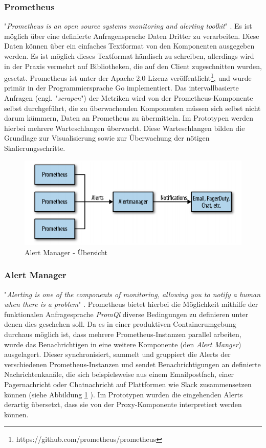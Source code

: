 \subsubsection{Prometheus}
\label{ss:prometheus}
"\emph{Prometheus is an open source systems monitoring and alerting toolkit}" \cite[Seite~400]{oreillyPrometheus}. Es ist möglich über eine definierte Anfragensprache Daten Dritter zu verarbeiten. Diese Daten können über ein einfaches Textformat von den Komponenten ausgegeben werden. Es ist möglich dieses Textformat händisch zu schreiben, allerdings wird in der Praxis vermehrt auf Bibliotheken, die auf den Client zugeschnitten wurden, gesetzt. Prometheus ist unter der Apache 2.0 Lizenz veröffentlicht\footnote{https://github.com/prometheus/prometheus}, und wurde primär in der Programmiersprache Go implementiert. Das intervallbasierte Anfragen (engl. "\emph{scrapen}") der Metriken wird von der Prometheus-Komponente selbst durchgeführt, die zu überwachenden Komponenten müssen sich selbst nicht darum kümmern, Daten an Prometheus zu übermitteln. Im Prototypen werden hierbei mehrere Warteschlangen überwacht. Diese Warteschlangen bilden die Grundlage zur Visualisierung sowie zur Überwachung der nötigen Skalierungsschritte.


\begin{figure}[ht!]
	\centering
	\includegraphics[width=.8\linewidth]{kapitel/problemloesung/implementierung/_img/alert-man-p291}
	\caption[Alert Manager - Übersicht]{Alert Manager - Übersicht \cite[Seite~291]{oreillyPrometheus}}
	\label{fig:alertManOverview}
\end{figure}

\subsubsection{Alert Manager}
"\emph{Alerting is one of the components of monitoring, allowing you to notify a human when there is a problem}" \cite[Seite~291]{oreillyPrometheus}. Prometheus bietet hierbei die Möglichkeit mithilfe der funktionalen Anfragesprache \emph{PromQl} diverse Bedingungen zu definieren unter denen dies geschehen soll. Da es in einer produktiven Containerumgebung durchaus möglich ist, dass mehrere Prometheus-Instanzen parallel arbeiten, wurde das Benachrichtigen in eine weitere Komponente (den \emph{Alert Manger}) ausgelagert. Dieser synchronisiert, sammelt und gruppiert die Alerts der verschiedenen Prometheus-Instanzen und sendet Benachrichtigungen an definierte Nachrichtenkanäle, die sich beispielsweise aus einem Emailpostfach, einer Pagernachricht oder Chatnachricht auf Plattformen wie Slack zusammensetzen können (siehe Abbildung \ref{fig:alertManOverview} ). Im Prototypen wurden die eingehenden Alerts derartig übersetzt, dass sie von der Proxy-Komponente interpretiert werden können.


